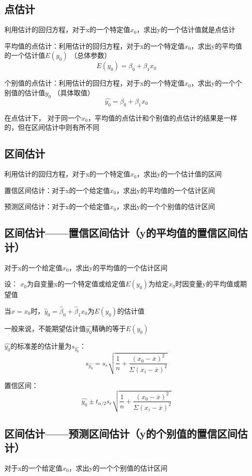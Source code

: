 \documentclass[UTF8,10pt]{book}
\begin{document}
\subsection{点估计}	
利用估计的回归方程，对于x的一个特定值$x_0$，求出y的一个估计值就是点估计 

平均值的点估计：利用估计的回归方程，对于x的一个特定值$x_0$，求出y的平均值的一个估计值$E(y_0)$ （总体参数） 
$$E(y_0) = \beta_0 + \beta_1 x_0 $$

个别值的点估计：利用估计的回归方程，对于x的一个特定值$x_0$，求出y的一个个别值的估计值$y_0$ （具体取值） 
$$\hat{y_0} = \beta_0 + \beta_1 x_0 $$ 

在点估计下， 对于同一个$x_0$，平均值的点估计和个别值的点估计的结果是一样的，但在区间估计中则有所不同

\subsection{区间估计}	
利用估计的回归方程，对于x的一个特定值$x_0$，求出y的一个估计值的区间 

置信区间估计：对于x的一个给定值$x_0$，求出y的平均值的一个估计区间

预测区间估计：对于x的一个给定值$x_0$，求出y的一个个别值的估计区间

\subsection{区间估计——置信区间估计（y的平均值的置信区间估计）}	
对于x的一个给定值$x_0$，求出y的平均值的一个估计区间 

设： $x_0$为自变量x的一个特定值或给定值$E(y_0)$为给定$x_0$时因变量y的平均值或期望值

当$x=x_0$时，$\hat{y}_0 = \hat{\beta}_0+\hat{\beta}_1 x_0$为$E(y_0)$的估计值 

一般来说，不能期望估计值$\hat{y_0}$精确的等于$E(y_0)$ 

$\hat{y_0}$的标准差的估计量为$s_{\hat{y_0}}$： 
$$ s_{\hat{y_0}} = s_e \sqrt{\frac{1}{n} + \frac{(x_0 - \overline{x})^2}{\Sigma (x_i - \overline{x})^2}} $$ 

置信区间： 
$$ \hat{y_0} \pm t_{\alpha / 2} s_e \sqrt{ \frac{1}{n} + \frac{(x_0 - \overline{x})^2}{\Sigma (x_i - \overline{x})^2}} $$

\subsection{区间估计——预测区间估计（y的个别值的置信区间估计）}	
对于x的一个给定值$x_0$，求出y的一个个别值的估计区间 
\end{document}
